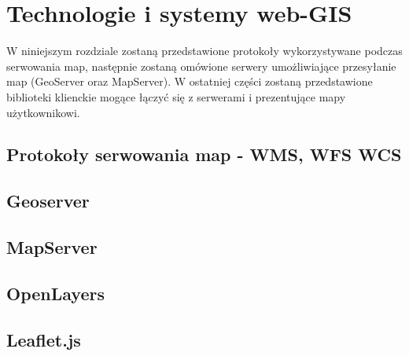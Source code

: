 \chapter{Technologie i systemy web-GIS}
W niniejszym rozdziale zostaną przedstawione protokoły wykorzystywane podczas serwowania map, następnie zostaną omówione serwery umożliwiające przesyłanie map (GeoServer oraz MapServer).
W ostatniej części zostaną przedstawione biblioteki klienckie mogące łączyć się z serwerami i prezentujące mapy użytkownikowi.

\section{Protokoły serwowania map - WMS, WFS WCS}

\section{Geoserver}

\section{MapServer}

\section{OpenLayers}

\section{Leaflet.js}
